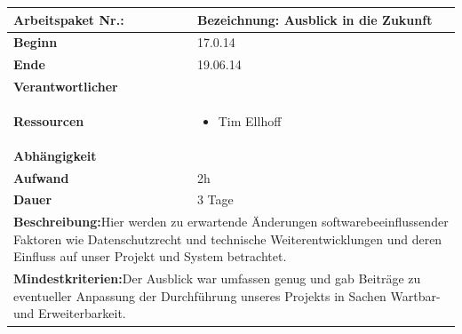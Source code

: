 \documentclass[fontsize=12pt,paper=a4,twoside]{scrartcl}
\begin{document}
	\begin{tabular}{|p{5.3cm}|p{9.7cm}|}\hline
		\textbf{Arbeitspaket Nr.:}  & \textbf{Bezeichnung:} Ausblick in die Zukunft\\ \hline \hline
		\textbf{Beginn} & 17.0.14\\ \hline
		\textbf{Ende} & 19.06.14\\ \hline
		\textbf{Verantwortlicher} & \\ \hline
		\textbf{Ressourcen} & \begin{itemize}
			\item Tim Ellhoff 
		\end{itemize}    \\ \hline
		\textbf{Abhängigkeit} &\\ \hline
		\textbf{Aufwand} & 2h\\ \hline
		\textbf{Dauer} & 3 Tage\\ \hline
		\multicolumn{2}{|p{15cm}|}{\textbf{Beschreibung:}\newline Hier werden zu erwartende Änderungen softwarebeeinflussender Faktoren wie Datenschutzrecht und technische Weiterentwicklungen und deren Einfluss auf unser Projekt und System betrachtet. }\\ \hline
		\multicolumn{2}{|p{15cm}|}{\textbf{Mindestkriterien:}\newline Der Ausblick war umfassen genug und gab Beiträge zu eventueller Anpassung der Durchführung unseres Projekts in Sachen Wartbar- und Erweiterbarkeit. }\\ \hline
	\end{tabular}
	
	\begin{verbatim} 
	\end{verbatim}
	
\end{document}
